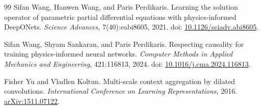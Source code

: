 \begin{thebibliography}{99}
Sifan Wang, Hanwen Wang, and Paris Perdikaris.
Learning the solution operator of parametric partial differential equations with
physics-informed DeepONets.
\emph{Science Advances}, 7(40):eabi8605, 2021.
doi: \href{https://doi.org/10.1126/sciadv.abi8605}{10.1126/sciadv.abi8605}.

Sifan Wang, Shyam Sankaran, and Paris Perdikaris.
Respecting causality for training physics-informed neural networks.
\emph{Computer Methods in Applied Mechanics and Engineering}, 421:116813, 2024.
doi: \href{https://doi.org/10.1016/j.cma.2024.116813}{10.1016/j.cma.2024.116813}.

Fisher Yu and Vladlen Koltun.
Multi-scale context aggregation by dilated convolutions.
\emph{International Conference on Learning Representations}, 2016.
\href{https://arxiv.org/abs/1511.07122}{arXiv:1511.07122}.

\end{thebibliography}